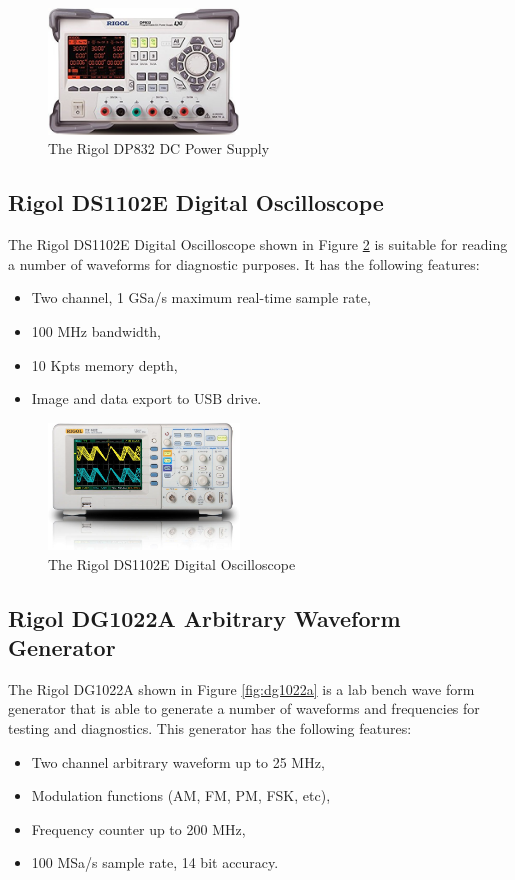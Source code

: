 \begin{figure}[ht]
\centering
\includegraphics[width=2in]{images/dp832.jpg}
\caption{The Rigol DP832 DC Power Supply}
\label{fig:dp832}
\end{figure}

\subsection{Rigol DS1102E Digital Oscilloscope}
The Rigol DS1102E Digital Oscilloscope shown in Figure \ref{fig:ds1102e} is suitable for reading a number of waveforms for diagnostic purposes.  It has the following features:

\begin{itemize}
\item Two channel, 1 GSa/s maximum real-time sample rate,
\item 100 MHz bandwidth,
\item 10 Kpts memory depth,
\item Image and data export to USB drive.
\end{itemize}

\begin{figure}[ht]
\centering
\includegraphics[width=2in]{images/DS1102E.jpg}
\caption{The Rigol DS1102E Digital Oscilloscope}
\label{fig:ds1102e}
\end{figure}

\subsection{Rigol DG1022A Arbitrary Waveform Generator}
The Rigol DG1022A shown in Figure \ref{fig:dg1022a} is a lab bench wave form generator that is able to generate a number of waveforms and frequencies for testing and diagnostics.  This generator has the following features:
\begin{itemize}
\item Two channel arbitrary waveform up to 25 MHz,
\item Modulation functions (AM, FM, PM, FSK, etc),
\item Frequency counter up to 200 MHz,
\item 100 MSa/s sample rate, 14 bit accuracy.
\end{itemize}

